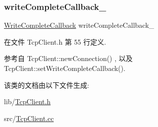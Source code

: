 \subsubsection{\texorpdfstring{write\+Complete\+Callback\+\_\+}{writeCompleteCallback\_}}
{\footnotesize\ttfamily \hyperlink{namespacemuduo_a605eda27d048a69607942b95735d7087}{Write\+Complete\+Callback} write\+Complete\+Callback\+\_\+\hspace{0.3cm}{\ttfamily [private]}}



在文件 Tcp\+Client.\+h 第 55 行定义.



参考自 Tcp\+Client\+::new\+Connection() , 以及 Tcp\+Client\+::set\+Write\+Complete\+Callback().



该类的文档由以下文件生成\+:\begin{DoxyCompactItemize}
\item 
lib/\hyperlink{TcpClient_8h}{Tcp\+Client.\+h}\item 
src/\hyperlink{TcpClient_8cc}{Tcp\+Client.\+cc}\end{DoxyCompactItemize}
